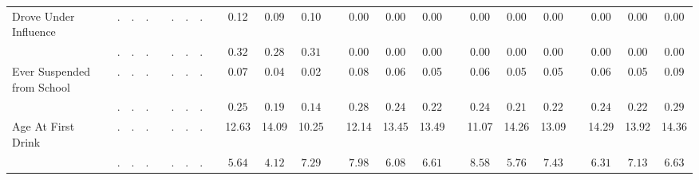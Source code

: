 \begin{center}
{\begin{longtable}{L{12em} c c c p{1.2em} c c c p{1.2em} c c c p{1.2em} c c c p{1.2em} c c c p{1.2em} c c c}
Drove Under Influence & . &         . &         . & &         . &         . &         . & &      0.12 &      0.09 &      0.10 & &      0.00 &      0.00 &      0.00 & &      0.00 &      0.00 &      0.00 & &      0.00 &      0.00 &      0.00 \\*
& $\mathit{        .}$ & $\mathit{        .}$ & $\mathit{        .}$ & & $\mathit{        .}$ & $\mathit{        .}$ & $\mathit{        .}$ & & $\mathit{     0.32}$ & $\mathit{     0.28}$ & $\mathit{     0.31}$ & & $\mathit{     0.00}$ & $\mathit{     0.00}$ & $\mathit{     0.00}$ & & $\mathit{     0.00}$ & $\mathit{     0.00}$ & $\mathit{     0.00}$ & & $\mathit{     0.00}$ & $\mathit{     0.00}$ & $\mathit{     0.00}$ \\[.7em]
Ever Suspended from School & . &         . &         . & &         . &         . &         . & &      0.07 &      0.04 &      0.02 & &      0.08 &      0.06 &      0.05 & &      0.06 &      0.05 &      0.05 & &      0.06 &      0.05 &      0.09 \\*
& $\mathit{        .}$ & $\mathit{        .}$ & $\mathit{        .}$ & & $\mathit{        .}$ & $\mathit{        .}$ & $\mathit{        .}$ & & $\mathit{     0.25}$ & $\mathit{     0.19}$ & $\mathit{     0.14}$ & & $\mathit{     0.28}$ & $\mathit{     0.24}$ & $\mathit{     0.22}$ & & $\mathit{     0.24}$ & $\mathit{     0.21}$ & $\mathit{     0.22}$ & & $\mathit{     0.24}$ & $\mathit{     0.22}$ & $\mathit{     0.29}$ \\[.7em]
Age At First Drink & . &         . &         . & &         . &         . &         . & &     12.63 &     14.09 &     10.25 & &     12.14 &     13.45 &     13.49 & &     11.07 &     14.26 &     13.09 & &     14.29 &     13.92 &     14.36 \\*
& $\mathit{        .}$ & $\mathit{        .}$ & $\mathit{        .}$ & & $\mathit{        .}$ & $\mathit{        .}$ & $\mathit{        .}$ & & $\mathit{     5.64}$ & $\mathit{     4.12}$ & $\mathit{     7.29}$ & & $\mathit{     7.98}$ & $\mathit{     6.08}$ & $\mathit{     6.61}$ & & $\mathit{     8.58}$ & $\mathit{     5.76}$ & $\mathit{     7.43}$ & & $\mathit{     6.31}$ & $\mathit{     7.13}$ & $\mathit{     6.63}$ \\[.7em]
\hline
\end{longtable}
}
\end{center}
